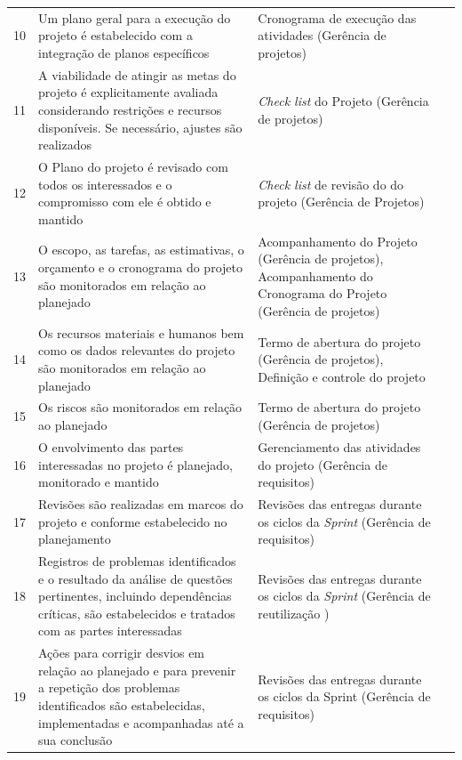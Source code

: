\documentclass{acm_proc_article-sp}
\begin{document}
\begin{appendices}
\begin{table}[h]
\begin{tabular}{|p{10mm}|p{60mm}|p{60mm}|p{25mm}|}
10 & Um plano geral para a execução do projeto é estabelecido com a integração de planos específicos & Cronograma de execução das atividades (Gerência de projetos) & \\
11 & A viabilidade de atingir as metas do projeto é explicitamente avaliada considerando restrições e recursos disponíveis. Se necessário, ajustes são realizados & \textit{Check list} do Projeto (Gerência de projetos) & \\
12 & O Plano do projeto é revisado com todos os interessados e o compromisso com ele é obtido e mantido &  \textit{Check list} de revisão do do projeto (Gerência de Projetos)&\\
13 & O escopo, as tarefas, as estimativas, o orçamento e o cronograma do projeto são monitorados em relação ao planejado & 
Acompanhamento do Projeto (Gerência de projetos), Acompanhamento do Cronograma do Projeto (Gerência de projetos) &\\
14 & Os recursos materiais e humanos bem como os dados relevantes do projeto são monitorados em relação ao planejado & 
Termo de abertura do projeto (Gerência de projetos), Definição e controle do projeto & \\
15 & Os riscos são monitorados em relação ao planejado & Termo de abertura do projeto (Gerência de projetos) & \\
16 & O envolvimento das partes interessadas no projeto é planejado, monitorado e mantido & Gerenciamento das atividades do projeto (Gerência de requisitos)  & \\
17 & Revisões são realizadas em marcos do projeto e conforme estabelecido no planejamento & Revisões das entregas durante os ciclos da \textit{Sprint} (Gerência de requisitos) & \\
18 & Registros de problemas identificados e o resultado da análise de questões pertinentes, incluindo dependências críticas, são
estabelecidos e tratados com as partes interessadas & Revisões das entregas durante os ciclos da \textit{Sprint} (Gerência de reutilização ) & \\
19 & Ações para corrigir desvios em relação ao planejado e para prevenir a repetição dos problemas identificados são estabelecidas, implementadas e acompanhadas até a sua conclusão & Revisões das entregas durante os ciclos da Sprint (Gerência de requisitos) & \\

\hline
\end{tabular}
\end{table}


\end{appendices}
\end{document}

